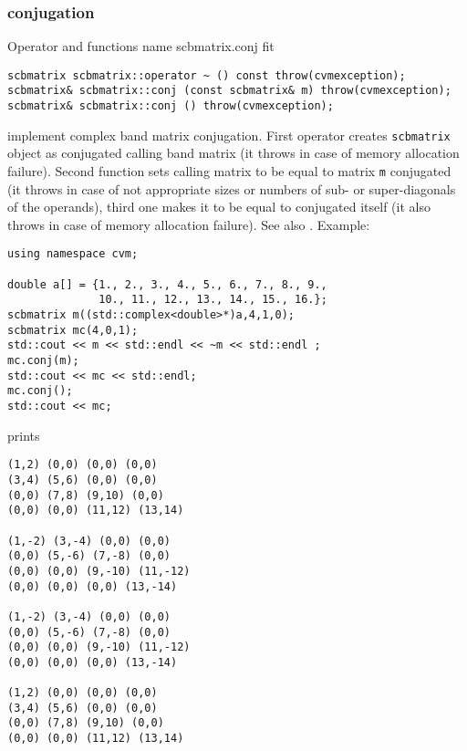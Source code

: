 \subsubsection{conjugation}
Operator and functions%
\pdfdest name {scbmatrix.conj} fit
\begin{verbatim}
scbmatrix scbmatrix::operator ~ () const throw(cvmexception);
scbmatrix& scbmatrix::conj (const scbmatrix& m) throw(cvmexception);
scbmatrix& scbmatrix::conj () throw(cvmexception);
\end{verbatim}
implement complex band matrix conjugation.
First operator creates \verb"scbmatrix" object as
 conjugated calling band matrix
(it throws  
in case of memory allocation failure). 
Second function sets  calling matrix to be equal to  matrix
\verb"m" conjugated
(it throws  
in case of not appropriate sizes or numbers of sub- or
super-diagonals of the operands), 
third one makes it to be equal to
conjugated itself (it also throws  
in case of memory allocation failure). 
See also .
Example:
\begin{Verbatim}
using namespace cvm;

double a[] = {1., 2., 3., 4., 5., 6., 7., 8., 9.,
              10., 11., 12., 13., 14., 15., 16.};
scbmatrix m((std::complex<double>*)a,4,1,0);
scbmatrix mc(4,0,1);
std::cout << m << std::endl << ~m << std::endl ;
mc.conj(m);
std::cout << mc << std::endl;
mc.conj();
std::cout << mc;
\end{Verbatim}
prints
\begin{Verbatim}
(1,2) (0,0) (0,0) (0,0)
(3,4) (5,6) (0,0) (0,0)
(0,0) (7,8) (9,10) (0,0)
(0,0) (0,0) (11,12) (13,14)

(1,-2) (3,-4) (0,0) (0,0)
(0,0) (5,-6) (7,-8) (0,0)
(0,0) (0,0) (9,-10) (11,-12)
(0,0) (0,0) (0,0) (13,-14)

(1,-2) (3,-4) (0,0) (0,0)
(0,0) (5,-6) (7,-8) (0,0)
(0,0) (0,0) (9,-10) (11,-12)
(0,0) (0,0) (0,0) (13,-14)

(1,2) (0,0) (0,0) (0,0)
(3,4) (5,6) (0,0) (0,0)
(0,0) (7,8) (9,10) (0,0)
(0,0) (0,0) (11,12) (13,14)
\end{Verbatim}
\newpage




